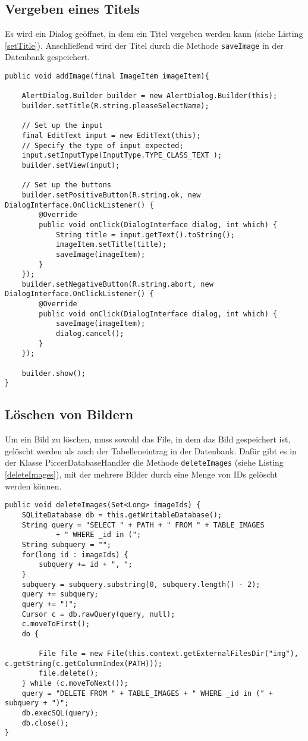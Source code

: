 \subsection{Vergeben eines Titels}
Es wird ein Dialog geöffnet, in dem ein Titel vergeben werden kann (siehe Listing \ref{setTitle}). Anschließend wird der Titel durch die Methode \verb+saveImage+ in der Datenbank gespeichert.
\begin{lstlisting}[caption={Titel vergeben}, label=setTitle]
public void addImage(final ImageItem imageItem){

    AlertDialog.Builder builder = new AlertDialog.Builder(this);
    builder.setTitle(R.string.pleaseSelectName);

    // Set up the input
    final EditText input = new EditText(this);
    // Specify the type of input expected;
    input.setInputType(InputType.TYPE_CLASS_TEXT );
    builder.setView(input);

    // Set up the buttons
    builder.setPositiveButton(R.string.ok, new DialogInterface.OnClickListener() {
        @Override
        public void onClick(DialogInterface dialog, int which) {
            String title = input.getText().toString();
            imageItem.setTitle(title);
            saveImage(imageItem);
        }
    });
    builder.setNegativeButton(R.string.abort, new DialogInterface.OnClickListener() {
        @Override
        public void onClick(DialogInterface dialog, int which) {
            saveImage(imageItem);
            dialog.cancel();
        }
    });

    builder.show();
}
\end{lstlisting}
\subsection{Löschen von Bildern}
Um ein Bild zu löschen, muss sowohl das File, in dem das Bild gespeichert ist, gelöscht
werden als auch der Tabelleneintrag in der Datenbank.
Dafür gibt es in der Klasse PiccerDatabaseHandler die Methode \verb+deleteImages+ (siehe Listing \ref{deleteImages}), mit der mehrere Bilder durch eine Menge von IDs gelöscht werden können.
\begin{lstlisting}[caption={Löschen mehrerer Bilder}, label=deleteImages]
public void deleteImages(Set<Long> imageIds) {
    SQLiteDatabase db = this.getWritableDatabase();
    String query = "SELECT " + PATH + " FROM " + TABLE_IMAGES
            + " WHERE _id in (";
    String subquery = "";
    for(long id : imageIds) {
        subquery += id + ", ";
    }
    subquery = subquery.substring(0, subquery.length() - 2);
    query += subquery;
    query += ")";
    Cursor c = db.rawQuery(query, null);
    c.moveToFirst();
    do {

        File file = new File(this.context.getExternalFilesDir("img"), c.getString(c.getColumnIndex(PATH)));
        file.delete();
    } while (c.moveToNext());
    query = "DELETE FROM " + TABLE_IMAGES + " WHERE _id in (" + subquery + ")";
    db.execSQL(query);
    db.close();
}
\end{lstlisting}

